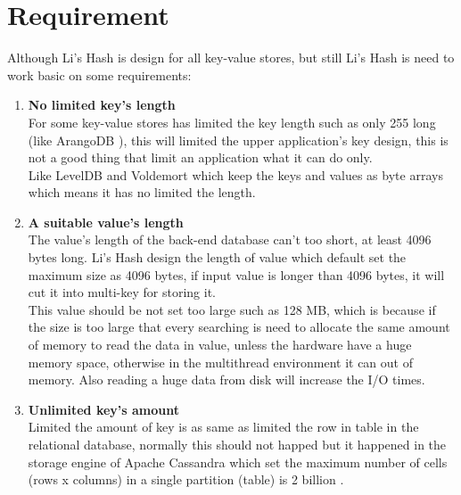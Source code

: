 \chapter{Requirement}
\label{chapter:requirement}

\baselineskip=26pt
\thispagestyle{empty}

Although Li's Hash is design for all key-value stores, but still Li's Hash is need to work basic on some requirements:

\begin{enumerate}

\item \textbf{No limited key's length}\\
For some key-value stores has limited the key length such as only 255 long (like ArangoDB \cite{web:arangodb:comparison}), this will limited the upper application's key design, this is not a good thing that limit an application what it can do only.\\

Like LevelDB \cite{web:leveldb:home-page} and Voldemort \cite{web:voldemort:any-limit-store-key} which keep the keys and values as byte arrays which means it has no limited the length.

\item \textbf{A suitable value's length}\\
The value's length of the back-end database can't too short, at least 4096 bytes long. Li's Hash design the length of value which default set the maximum size as 4096 bytes, if input value is longer than 4096 bytes, it will cut it into multi-key for storing it.\\

 This value should be not set too large such as 128 MB, which is because if the size is too large that every searching is need to allocate the same amount of memory to read the data in value, unless the hardware have a huge memory space, otherwise in the multithread environment it can out of memory. Also reading a huge data from disk will increase the I/O times.

\item \textbf{Unlimited key's amount}\\
Limited the amount of key is as same as limited the row in table in the relational database, normally this should not happed but it happened in the storage engine of Apache Cassandra which set the maximum number of cells (rows x columns) in a single partition (table) is 2 billion \cite{web:cassandra:limitations}.\\


\end{enumerate}
